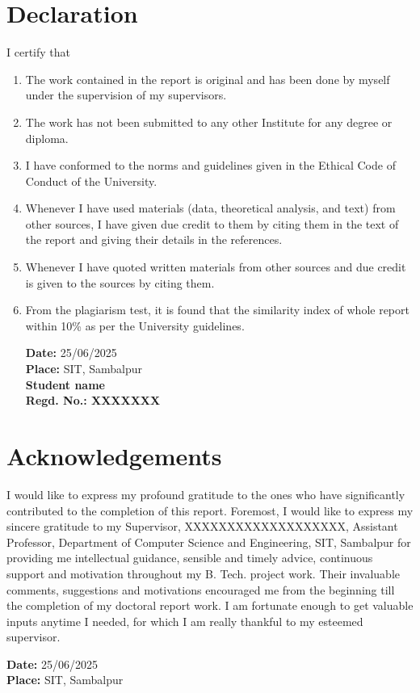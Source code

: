 \chapter*{Declaration}
\flushleft
\justify
I certify that 
\begin{enumerate}[label=(\alph*)]
	\item The work contained in the report is original and has been done by myself under the supervision of my supervisors.
	\item The work has not been submitted to any other Institute for any degree or diploma.
	\item I have conformed to the norms and guidelines given in the Ethical Code of Conduct of the University.
	\item Whenever I have used materials (data, theoretical analysis, and text) from other sources, I have given due credit to them by citing them in the text of the report and giving their details in the references.
	\item Whenever I have quoted written materials from other sources and due credit is given to the sources by citing them.
	\item From the plagiarism test, it is found that the similarity index of whole report within 10\% as per the University guidelines.
	
\flushleft
\textbf{Date:} 25/06/2025 \\
\textbf{Place:} SIT, Sambalpur \\

	\flushright
	\textbf{Student name \\ Regd. No.: XXXXXXX}
\end{enumerate}

\clearpage
\chapter*{Acknowledgements}
\justify
{
I would like to express my profound gratitude to the ones who have significantly contributed to the completion of this report. Foremost, I would like to express my sincere gratitude to my Supervisor, XXXXXXXXXXXXXXXXXXX, Assistant Professor, Department of Computer Science and Engineering, SIT, Sambalpur for providing me intellectual guidance, sensible and timely advice, continuous support and motivation throughout my B. Tech. project work. Their invaluable comments, suggestions and motivations encouraged me from the beginning till the completion of my doctoral report work. I am fortunate enough to get valuable inputs anytime I needed, for which I am really thankful to my esteemed supervisor.

}
\flushleft
\textbf{Date:} 25/06/2025 \\
\textbf{Place:} SIT, Sambalpur \\

